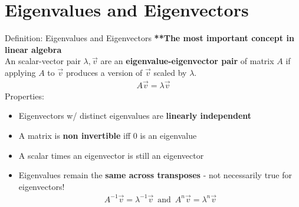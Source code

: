 \section{Eigenvalues and Eigenvectors}

\begin{frame}{Definition: Eigenvalues and Eigenvectors}
    \textbf{**The most important concept in linear algebra} \\[1ex]
    An scalar-vector pair $\lambda, \vec{v}$ are an \textbf{eigenvalue-eigenvector pair} of matrix $A$ if applying $A$ to $\vec{v}$ produces a version of $\vec{v}$ scaled by $\lambda$. \\
    {\fontsize{20}{10}\selectfont
        \begin{align*}
            A\vec{v} = \lambda \vec{v}
        \end{align*}
    }
    Properties:
    \begin{itemize}
        \item Eigenvectors w/ distinct eigenvalues are \textbf{linearly independent}
        \item A matrix is \textbf{non invertible} iff 0 is an eigenvalue
        \item A scalar times an eigenvector is still an eigenvector
        \item Eigenvalues remain the \textbf{same across transposes} - not necessarily true for eigenvectors! 
        \begin{align*}
            A^{-1} \vec{v} = \lambda^{-1} \vec{v} \,\,\,
            \text{and} \,\,\,
            A^n \vec{v} = \lambda^n \vec{v}
        \end{align*}
    \end{itemize}
\end{frame}

